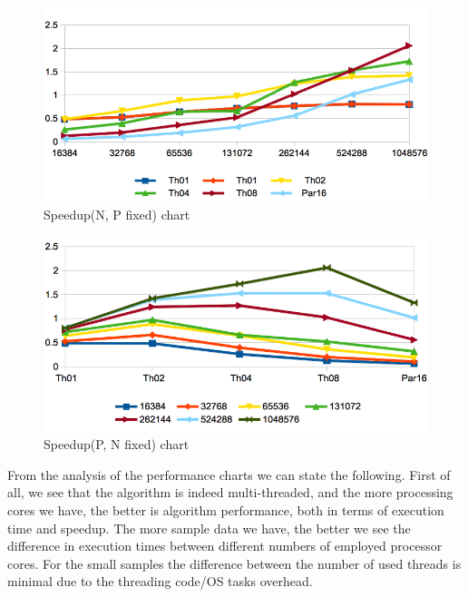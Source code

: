 \documentclass[a4paper,10pt,notitlepage]{article}
\begin{document}
\begin{figure}[!htb]
\centering
\includegraphics[scale=0.5]{1-sn.png}
\caption{Speedup(N, P fixed) chart}
\label{fig:1-sn}
\end{figure}

\begin{figure}[!htb]
\centering
\includegraphics[scale=0.5]{1-sp.png}
\caption{Speedup(P, N fixed) chart}
\label{fig:1-sp}
\end{figure}

From the analysis of the performance charts we can state the following. First of all, we see that the algorithm is indeed multi-threaded, and the more processing cores we have, the better is algorithm performance, both in terms of execution time and speedup. The more sample data we have, the better we see the difference in execution times between different numbers of employed processor cores. For the small samples the difference between the number of used threads is minimal due to the threading code/OS tasks overhead.
\end{document}
